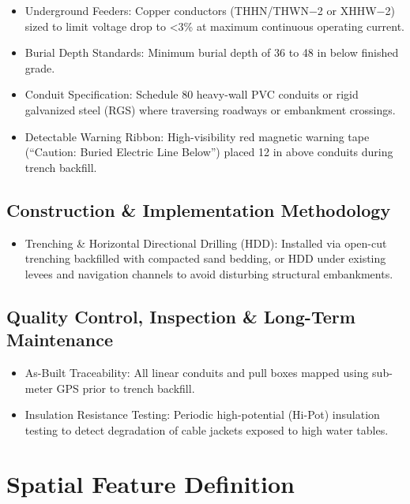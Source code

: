 \documentclass[
  letterpaper,
  DIV=11,
  numbers=noendperiod]{scrreprt}
\providecommand{\tightlist}{%
  \setlength{\itemsep}{0pt}\setlength{\parskip}{0pt}}
\begin{document}
\begin{itemize}
\item
  Underground Feeders: Copper conductors (THHN/THWN−2 or XHHW−2) sized
  to limit voltage drop to \textless3\% at maximum continuous operating
  current.
\item
  Burial Depth Standards: Minimum burial depth of 36 to 48 in below
  finished grade.
\item
  Conduit Specification: Schedule 80 heavy-wall PVC conduits or rigid
  galvanized steel (RGS) where traversing roadways or embankment
  crossings.
\item
  Detectable Warning Ribbon: High-visibility red magnetic warning tape
  (``Caution: Buried Electric Line Below'') placed 12 in above conduits
  during trench backfill.
\end{itemize}

\subsection{Construction \& Implementation
Methodology}\label{construction-implementation-methodology-19}

\begin{itemize}
\tightlist
\item
  Trenching \& Horizontal Directional Drilling (HDD): Installed via
  open-cut trenching backfilled with compacted sand bedding, or HDD
  under existing levees and navigation channels to avoid disturbing
  structural embankments.
\end{itemize}

\subsection{Quality Control, Inspection \& Long-Term
Maintenance}\label{quality-control-inspection-long-term-maintenance-19}

\begin{itemize}
\item
  As-Built Traceability: All linear conduits and pull boxes mapped using
  sub-meter GPS prior to trench backfill.
\item
  Insulation Resistance Testing: Periodic high-potential (Hi-Pot)
  insulation testing to detect degradation of cable jackets exposed to
  high water tables.
\end{itemize}

\section{Spatial Feature Definition}\label{spatial-feature-definition}
\end{document}
